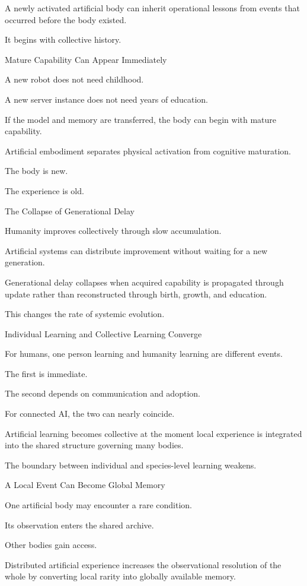 A newly activated artificial body can inherit operational lessons from events that occurred before the body existed.

It begins with collective history.

Mature Capability Can Appear Immediately

A new robot does not need childhood.

A new server instance does not need years of education.

If the model and memory are transferred, the body can begin with mature capability.

Artificial embodiment separates physical activation from cognitive maturation.

The body is new.

The experience is old.

The Collapse of Generational Delay

Humanity improves collectively through slow accumulation.

Artificial systems can distribute improvement without waiting for a new generation.

Generational delay collapses when acquired capability is propagated through update rather than reconstructed through birth, growth, and education.

This changes the rate of systemic evolution.

Individual Learning and Collective Learning Converge

For humans, one person learning and humanity learning are different events.

The first is immediate.

The second depends on communication and adoption.

For connected AI, the two can nearly coincide.

Artificial learning becomes collective at the moment local experience is integrated into the shared structure governing many bodies.

The boundary between individual and species-level learning weakens.

A Local Event Can Become Global Memory

One artificial body may encounter a rare condition.

Its observation enters the shared archive.

Other bodies gain access.

Distributed artificial experience increases the observational resolution of the whole by converting local rarity into globally available memory.

